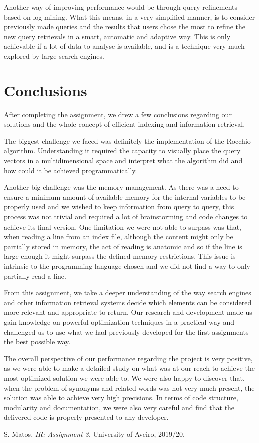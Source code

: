 \documentclass[12pt]{article}
\begin{document}
Another way of improving performance would be through query refinements based on
log mining.
What this means, in a very simplified manner, is to consider previously made
queries and the results that users chose the most to refine the new query retrievals
in a smart, automatic and adaptive way.
This is only achievable if a lot of data to analyse is available, and is a technique
very much explored by large search engines.

\newpage
\section{Conclusions}

After completing the assignment, we drew a few conclusions regarding our
solutions and the whole concept of efficient indexing and information retrieval.

The biggest challenge we faced was definitely the implementation of the Rocchio 
algorithm.
Understanding it required the capacity to visually place the query vectors in a 
multidimensional space and interpret what the algorithm did and how could it be 
achieved programmatically.

Another big challenge was the memory management.
As there was a need to ensure a minimum amount of available memory for the internal
variables to be properly used and we wished to keep information from query to query,
this process was not trivial and required a lot of brainstorming and code changes 
to achieve its final version.
One limitation we were not able to surpass was that, when reading a line from an 
index file, although the content might only be partially stored in memory, the act
of reading is anatomic and so if the line is large enough it might surpass the 
defined memory restrictions.
This issue is intrinsic to the programming language chosen and we did not find a 
way to only partially read a line.

From this assignment, we take a deeper understanding of the way search engines 
and other information retrieval systems decide which elements can be considered
more relevant and appropriate to return.
Our research and development made us gain knowledge on powerful optimization 
techniques in a practical way and challenged us to use what we had previously
developed for the first assignments the best possible way.

The overall perspective of our performance regarding the project is very positive,
as we were able to make a detailed study on what was at our reach to achieve the 
most optimized solution we were able to.
We were also happy to discover that, when the problem of synonyms and related 
words was not very much present, the solution was able to achieve very high 
precisions.
In terms of code structure, modularity and documentation, we were also very 
careful and find that the delivered code is properly presented to any developer.

\begin{thebibliography}{9}
  

    S. Matos,
    \textit{IR: Assignment 3},
    University of Aveiro,
    2019/20.
  
\end{thebibliography}

\clearpage
\end{document}
